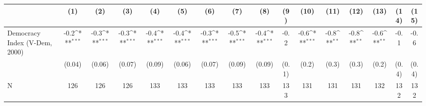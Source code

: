 {
\def\sym#1{\ifmmode^{#1}\else\(^{#1}\)\fi}
\begin{tabular}{l*{15}{c}}
\hline\hline
                    &\multicolumn{1}{c}{(1)}         &\multicolumn{1}{c}{(2)}         &\multicolumn{1}{c}{(3)}         &\multicolumn{1}{c}{(4)}         &\multicolumn{1}{c}{(5)}         &\multicolumn{1}{c}{(6)}         &\multicolumn{1}{c}{(7)}         &\multicolumn{1}{c}{(8)}         &\multicolumn{1}{c}{(9)}         &\multicolumn{1}{c}{(10)}         &\multicolumn{1}{c}{(11)}         &\multicolumn{1}{c}{(12)}         &\multicolumn{1}{c}{(13)}         &\multicolumn{1}{c}{(14)}         &\multicolumn{1}{c}{(15)}         \\
\hline
Democracy Index (V-Dem, 2000)&        -0.2\sym{***}&        -0.3\sym{***}&        -0.3\sym{***}&        -0.4\sym{***}&        -0.4\sym{***}&        -0.3\sym{***}&        -0.5\sym{***}&        -0.4\sym{***}&        -0.2         &        -0.6\sym{***}&        -0.8\sym{**} &        -0.8\sym{**} &        -0.6\sym{**} &        -0.1         &        -0.6         \\
                    &      (0.04)         &      (0.06)         &      (0.07)         &      (0.09)         &      (0.06)         &      (0.07)         &      (0.09)         &      (0.09)         &       (0.1)         &       (0.2)         &       (0.3)         &       (0.3)         &       (0.2)         &       (0.4)         &       (0.4)         \\
\hline
N                   &         126         &         126         &         126         &         133         &         133         &         133         &         133         &         133         &         133         &         131         &         131         &         131         &         132         &         132         &         132         \\
\hline\hline
\end{tabular}
}
